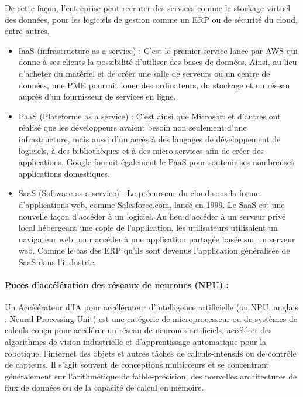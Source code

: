 De cette façon, l'entreprise peut recruter des services comme le stockage virtuel des données, pour les logiciels de gestion comme un ERP ou de sécurité du cloud, entre autres.
\begin{itemize}
    \item IaaS (infrastructure as a service) : C'est le premier service lancé par AWS qui donne à ses clients la possibilité d'utiliser des bases de données. Ainsi, au lieu d'acheter du matériel et de créer une salle de serveurs ou un centre de données, une PME pourrait louer des ordinateurs, du stockage et un réseau auprès d'un fournisseur de services en ligne.
    \item PaaS (Plateforme as a service) : C'est ainsi que Microsoft et d'autres ont réalisé que les développeurs avaient besoin non seulement d'une infrastructure, mais aussi d'un accès à des langages de développement de logiciels, à des bibliothèques et à des micro-services afin de créer des applications. Google fournit également le PaaS pour soutenir ses nombreuses applications domestiques.
    \item SaaS (Software as a service) : Le précurseur du cloud sous la forme d'applications web, comme Salesforce.com, lancé en 1999. Le SaaS est une nouvelle façon d'accéder à un logiciel. Au lieu d'accéder à un serveur privé local hébergeant une copie de l'application, les utilisateurs utilisaient un navigateur web pour accéder à une application partagée basée sur un serveur web. Comme le cas des ERP qu'ils sont devenus l'application généralisée de SaaS dans l'industrie.

\end{itemize}
\newpage
\paragraph{Puces d'accélération des réseaux de neurones (NPU) :}

Un Accélérateur d'IA pour accélérateur d'intelligence artificielle (ou NPU, anglais : Neural Processing Unit) est une catégorie de microprocesseur ou de systèmes de calculs conçu pour accélérer un réseau de neurones artificiels, accélérer des algorithmes de vision industrielle et d'apprentissage automatique pour la robotique, l'internet des objets et autres tâches de calculs-intensifs ou de contrôle de capteurs. Il s'agit souvent de conceptions multicœurs et se concentrant généralement sur l'arithmétique de faible-précision, des nouvelles architectures de flux de données ou de la capacité de calcul en mémoire.

